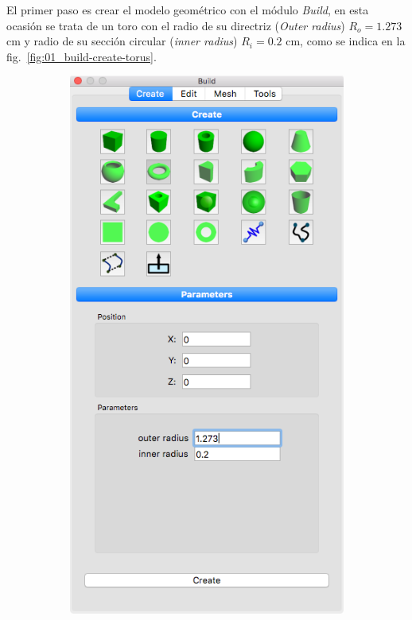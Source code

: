 El primer paso es crear el modelo geométrico con el módulo \emph{Build}, en esta ocasión se trata de un toro con el radio de su directriz (\emph{Outer radius}) $R_{o}=1.273$ cm y radio de su sección circular (\emph{inner radius}) $R_{i}=0.2$ cm, como se indica en la fig.~\ref{fig:01_build-create-torus}.
\begin{figure}[!ht]
\centering
\begin{subfigure}[b]{0.28\textwidth}
\centering
\includegraphics[width=\linewidth]{figuras_4/01_build-create.png}

\end{subfigure}
\end{figure}
